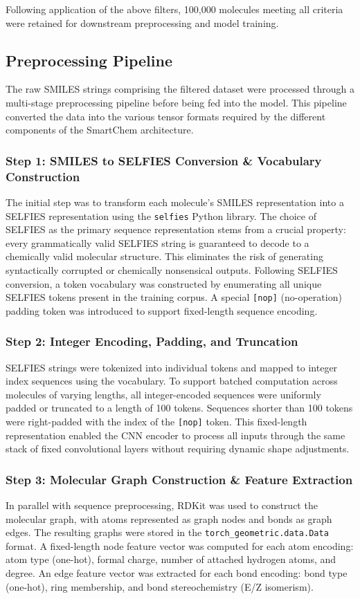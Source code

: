 \documentclass[12pt,a4paper]{report}
\begin{document}
Following application of the above filters, 100,000 molecules meeting all criteria were retained for downstream preprocessing and model training.

\subsection{Preprocessing Pipeline}

The raw SMILES strings comprising the filtered dataset were processed through a multi-stage preprocessing pipeline before being fed into the model. This pipeline converted the data into the various tensor formats required by the different components of the SmartChem architecture.

\subsubsection*{Step 1: SMILES to SELFIES Conversion \& Vocabulary Construction}
The initial step was to transform each molecule's SMILES representation into a SELFIES representation using the \texttt{selfies} Python library. The choice of SELFIES as the primary sequence representation stems from a crucial property: every grammatically valid SELFIES string is guaranteed to decode to a chemically valid molecular structure. This eliminates the risk of generating syntactically corrupted or chemically nonsensical outputs. Following SELFIES conversion, a token vocabulary was constructed by enumerating all unique SELFIES tokens present in the training corpus. A special \texttt{[nop]} (no-operation) padding token was introduced to support fixed-length sequence encoding.

\subsubsection*{Step 2: Integer Encoding, Padding, and Truncation}
SELFIES strings were tokenized into individual tokens and mapped to integer index sequences using the vocabulary. To support batched computation across molecules of varying lengths, all integer-encoded sequences were uniformly padded or truncated to a length of 100 tokens. Sequences shorter than 100 tokens were right-padded with the index of the \texttt{[nop]} token. This fixed-length representation enabled the CNN encoder to process all inputs through the same stack of fixed convolutional layers without requiring dynamic shape adjustments.

\subsubsection*{Step 3: Molecular Graph Construction \& Feature Extraction}
In parallel with sequence preprocessing, RDKit was used to construct the molecular graph, with atoms represented as graph nodes and bonds as graph edges. The resulting graphs were stored in the \texttt{torch\_geometric.data.Data} format. A fixed-length node feature vector was computed for each atom encoding: atom type (one-hot), formal charge, number of attached hydrogen atoms, and degree. An edge feature vector was extracted for each bond encoding: bond type (one-hot), ring membership, and bond stereochemistry (E/Z isomerism).
\end{document}
